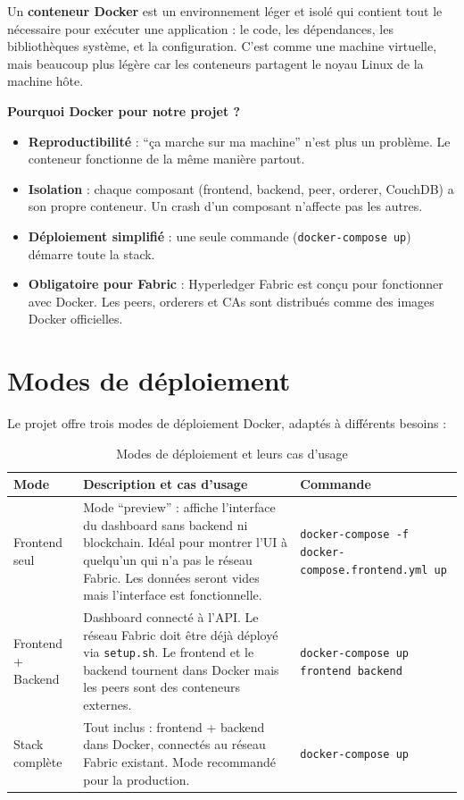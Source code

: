 \documentclass[12pt,a4paper,twoside]{report}
\begin{document}
\begin{infobox}
Un \textbf{conteneur Docker} est un environnement léger et isolé qui contient tout le nécessaire pour exécuter une application : le code, les dépendances, les bibliothèques système, et la configuration. C'est comme une machine virtuelle, mais beaucoup plus légère car les conteneurs partagent le noyau Linux de la machine hôte.

\textbf{Pourquoi Docker pour notre projet ?}
\begin{itemize}
    \item \textbf{Reproductibilité} : ``ça marche sur ma machine'' n'est plus un problème. Le conteneur fonctionne de la même manière partout.
    \item \textbf{Isolation} : chaque composant (frontend, backend, peer, orderer, CouchDB) a son propre conteneur. Un crash d'un composant n'affecte pas les autres.
    \item \textbf{Déploiement simplifié} : une seule commande (\texttt{docker-compose up}) démarre toute la stack.
    \item \textbf{Obligatoire pour Fabric} : Hyperledger Fabric est conçu pour fonctionner avec Docker. Les peers, orderers et CAs sont distribués comme des images Docker officielles.
\end{itemize}
\end{infobox}

\section{Modes de déploiement}

Le projet offre trois modes de déploiement Docker, adaptés à différents besoins :

\begin{table}[H]
\centering
\begin{tabularx}{\textwidth}{lXl}
\toprule
\textbf{Mode} & \textbf{Description et cas d'usage} & \textbf{Commande} \\
\midrule
Frontend seul & Mode ``preview'' : affiche l'interface du dashboard sans backend ni blockchain. Idéal pour montrer l'UI à quelqu'un qui n'a pas le réseau Fabric. Les données seront vides mais l'interface est fonctionnelle. & \texttt{docker-compose -f docker-compose.frontend.yml up} \\
\addlinespace
Frontend + Backend & Dashboard connecté à l'API. Le réseau Fabric doit être déjà déployé via \texttt{setup.sh}. Le frontend et le backend tournent dans Docker mais les peers sont des conteneurs externes. & \texttt{docker-compose up frontend backend} \\
\addlinespace
Stack complète & Tout inclus : frontend + backend dans Docker, connectés au réseau Fabric existant. Mode recommandé pour la production. & \texttt{docker-compose up} \\
\bottomrule
\end{tabularx}
\caption{Modes de déploiement et leurs cas d'usage}
\end{table}
\end{document}
